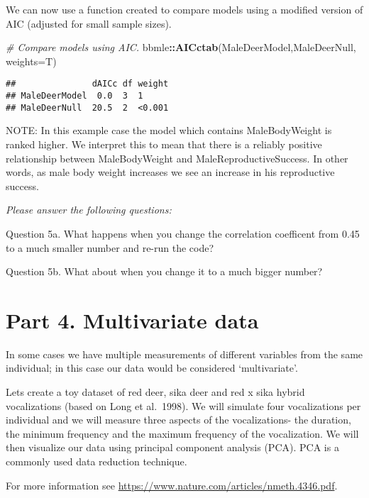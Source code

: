\documentclass[]{book}
\newenvironment{Shaded}{\begin{snugshade}}{\end{snugshade}}
\newcommand{\CommentTok}[1]{\textcolor[rgb]{0.56,0.35,0.01}{\textit{#1}}}
\newcommand{\DataTypeTok}[1]{\textcolor[rgb]{0.13,0.29,0.53}{#1}}
\newcommand{\KeywordTok}[1]{\textcolor[rgb]{0.13,0.29,0.53}{\textbf{#1}}}
\newcommand{\NormalTok}[1]{#1}
\newcommand{\OperatorTok}[1]{\textcolor[rgb]{0.81,0.36,0.00}{\textbf{#1}}}
\begin{document}
We can now use a function created to compare models using a modified version of AIC (adjusted for small sample sizes).

\begin{Shaded}
\begin{Highlighting}[]
\CommentTok{# Compare models using AIC.}
\NormalTok{bbmle}\OperatorTok{::}\KeywordTok{AICctab}\NormalTok{(MaleDeerModel,MaleDeerNull, }\DataTypeTok{weights=}\NormalTok{T)}
\end{Highlighting}
\end{Shaded}

\begin{verbatim}
##               dAICc df weight
## MaleDeerModel  0.0  3  1     
## MaleDeerNull  20.5  2  <0.001
\end{verbatim}

NOTE: In this example case the model which contains MaleBodyWeight is ranked higher. We interpret this to mean that there is a reliably positive relationship between MaleBodyWeight and MaleReproductiveSuccess. In other words, as male body weight increases we see an increase in his reproductive success.

\emph{Please answer the following questions:}

Question 5a. What happens when you change the correlation coefficent from 0.45 to a much smaller number and re-run the code?

Question 5b. What about when you change it to a much bigger number?

\hypertarget{part-4.-multivariate-data}{%
\section*{Part 4. Multivariate data}\label{part-4.-multivariate-data}}

In some cases we have multiple measurements of different variables from the same individual; in this case our data would be considered `multivariate'.

Lets create a toy dataset of red deer, sika deer and red x sika hybrid vocalizations (based on Long et al.~1998). We will simulate four vocalizations per individual and we will measure three aspects of the vocalizations- the duration, the minimum frequency and the maximum frequency of the vocalization. We will then visualize our data using principal component analysis (PCA). PCA is a commonly used data reduction technique.

For more information see \url{https://www.nature.com/articles/nmeth.4346.pdf}.
\end{document}
